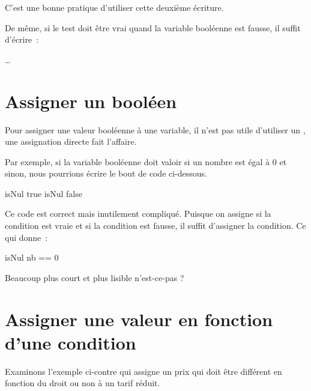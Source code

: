 	C'est une bonne pratique d'utiliser cette deuxième écriture. 
	
	De même, si le test doit être vrai quand la variable booléenne est fausse,
	il suffit d’écrire~: 
	
	\begin{pseudocode}
			\Stmt \dots
		\EndIf
	\end{pseudocode}


\section{Assigner un booléen}\label{B-ass-bool}

	Pour assigner une valeur booléenne à une variable, il n'est pas utile
	d'utiliser un , une assignation directe fait l'affaire. 

	Par exemple, si la variable booléenne  doit valoir  si un
	nombre est égal à 0 et  sinon, nous pourrions écrire le bout de
	code ci-dessous.	

	\begin{wrong}
	\begin{pseudocode}
		\If{nb == 0}
			\Let isNul \Gets true
		\Else
			\Let isNul \Gets false
		\EndIf
	\end{pseudocode}
	\end{wrong}


	Ce code est correct mais inutilement compliqué.  Puisque on assigne
	 si la condition est vraie et  si la condition est
	fausse, il suffit d’assigner la condition.  Ce qui donne~:

	\begin{pseudocode}
		\Let isNul \Gets nb == 0
	\end{pseudocode}

	Beaucoup plus court et plus lisible n'est-ce-pas ? 


\section{Assigner une valeur en fonction d’une condition}\label{B-ass-val}

	Examinons l’exemple ci-contre qui assigne un prix  qui doit être
	différent en fonction du droit ou non à un tarif réduit.  
	
